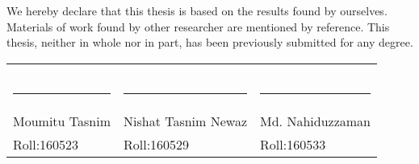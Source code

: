 We hereby declare that this thesis is based on the results found by ourselves. Materials
of work found by other researcher are mentioned by reference. This thesis, neither in
whole nor in part, has been previously submitted for any degree.

\bigskip
\bigskip
\bigskip


\begin{tabular}{p{5cm}p{5cm}p{5cm}}
\centering
     &  &   \\
     &  &   \\
     &  &   \\
  \rule{3.5cm}{1pt} & \rule{3.5cm}{1pt} & \rule{3.5cm}{1pt}\\
  Moumitu Tasnim & Nishat Tasnim Newaz &Md. Nahiduzzaman\\
  Roll:160523 & Roll:160529  &Roll:160533\\

\end{tabular}
